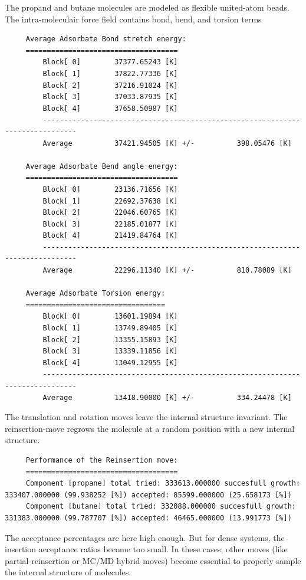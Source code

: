 The propand and butane molecules are modeled as flexible united-atom beads.
The intra-moleculair force field contains bond, bend, and torsion terms
\begin{tiny}
\begin{verbatim}
     Average Adsorbate Bond stretch energy:
     ====================================
         Block[ 0]        37377.65243 [K]
         Block[ 1]        37822.77336 [K]
         Block[ 2]        37216.91024 [K]
         Block[ 3]        37033.87935 [K]
         Block[ 4]        37658.50987 [K]
         ------------------------------------------------------------------------------
         Average          37421.94505 [K] +/-          398.05476 [K]
     
     Average Adsorbate Bend angle energy:
     ====================================
         Block[ 0]        23136.71656 [K]
         Block[ 1]        22692.37638 [K]
         Block[ 2]        22046.60765 [K]
         Block[ 3]        22185.01877 [K]
         Block[ 4]        21419.84764 [K]
         ------------------------------------------------------------------------------
         Average          22296.11340 [K] +/-          810.78089 [K]
     
     Average Adsorbate Torsion energy:
     =================================
         Block[ 0]        13601.19894 [K]
         Block[ 1]        13749.89405 [K]
         Block[ 2]        13355.15893 [K]
         Block[ 3]        13339.11856 [K]
         Block[ 4]        13049.12955 [K]
         ------------------------------------------------------------------------------
         Average          13418.90000 [K] +/-          334.24478 [K]
\end{verbatim}
\end{tiny}
The translation and rotation moves leave the internal structure invariant.
The reinsertion-move regrows the molecule at a random position with a new internal structure.
\begin{tiny}
\begin{verbatim}
     Performance of the Reinsertion move:
     ====================================
     Component [propane] total tried: 333613.000000 succesfull growth: 333407.000000 (99.938252 [%]) accepted: 85599.000000 (25.658173 [%])
     Component [butane] total tried: 332088.000000 succesfull growth: 331383.000000 (99.787707 [%]) accepted: 46465.000000 (13.991773 [%])
\end{verbatim}
\end{tiny}
The acceptance percentages are here high enough. But for dense systems, the insertion acceptance ratios become too small.
In these cases, other moves (like partial-reinsertion or MC/MD hybrid moves) become essential to properly sample the internal structure of molecules.

